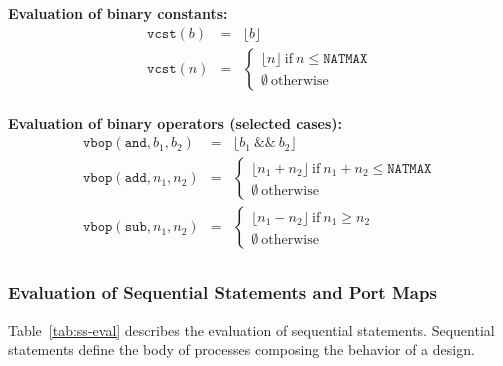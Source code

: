 \documentclass[pdflatex,sn-mathphys]{sn-jnl}%
\theoremstyle{thmstyleone}%
\theoremstyle{thmstyletwo}%
\theoremstyle{thmstylethree}%
\begin{document}
\begin{table}[!t]
  \vspace{10pt}

  \textbf{Evaluation of binary constants:}
  \begin{eqnarray*}
    \label{eq:vcst}
    \mathtt{vcst}(b) & = & \lfloor{}b\rfloor \\
    \mathtt{vcst}(n) & = & \begin{cases}
                             \lfloor{}n\rfloor~\mathrm{if}~n\le\mathtt{NATMAX} \\
                             \emptyset~\mathrm{otherwise} \end{cases} \\
  \end{eqnarray*}
  
  \textbf{Evaluation of binary operators (selected cases):}
  \begin{eqnarray*}
    \label{eq:vbop}
    \mathtt{vbop}(\mathtt{and}, b_1, b_2) & = & \lfloor{}b_1~\&\&~b_2\rfloor \\
    \mathtt{vbop}(\mathtt{add}, n_1, n_2) & = & \begin{cases}
                                                  \lfloor{}n_1+n_2\rfloor~\mathrm{if}~n_1+n_2\le\mathtt{NATMAX} \\
                                                  \emptyset~\mathrm{otherwise} \end{cases} \\
    \mathtt{vbop}(\mathtt{sub}, n_1, n_2) & = & \begin{cases}
                                                  \lfloor{}n_1-n_2\rfloor~\mathrm{if}~n_1\ge{}n_2 \\
                                                  \emptyset~\mathrm{otherwise}
                                                \end{cases} \\
  \end{eqnarray*}
  
\end{table}

\subsubsection{Evaluation of Sequential Statements and Port Maps}
\label{subsubsec:ss-and-port-map-eval}

Table~\ref{tab:ss-eval} describes the evaluation of sequential
statements. Sequential statements define the body of processes
composing the behavior of a \hvhdl{} design.
\end{document}

